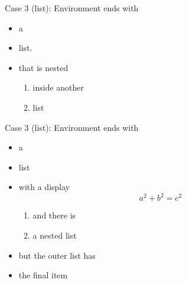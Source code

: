 \begin{remark}
  Case 3 (list): Environment ends with
  \begin{itemize}
  \item a
  \item list.
  \item that is nested
    \begin{enumerate}
    \item inside another
    \item list
    \end{enumerate}
  \end{itemize}
\end{remark}

\begin{note}
  Case 3 (list): Environment ends with
  \begin{itemize}
  \item a
  \item list
  \item with a display
    \[
      a^2 + b^2 = c^2
    \]
    \begin{enumerate}
    \item and there is
    \item a nested list
    \end{enumerate}
  \item but the outer list has
  \item the final item
  \end{itemize}
\end{note}

